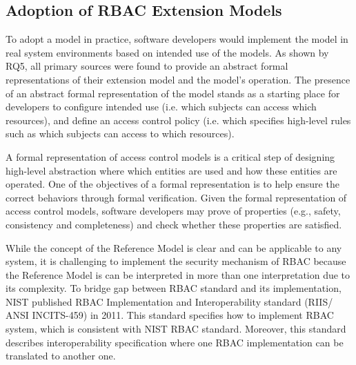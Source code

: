 \subsection{Adoption of RBAC Extension Models}

To adopt a model in practice, software developers would implement the model in real system environments based on intended use of the models. 
As shown by RQ5, all primary sources were found to provide an abstract formal representations of their extension model and the model's operation.
The presence of an abstract formal representation of the model stands as a starting place for developers to configure intended use (i.e. which subjects can access which resources), and define an access control policy (i.e. which specifies high-level rules such as which subjects can access to which resources). 

A formal representation of access control models is a critical step of designing high-level abstraction where which entities are used and how these entities are operated.
One of the objectives of a formal representation is to help ensure the correct behaviors through formal verification. 
Given the formal representation of access control models, software developers may prove of properties (e.g., safety, consistency and completeness) and check whether these properties are satisfied. 

While the concept of the Reference Model is clear and can be applicable to any system, it is challenging to implement the security mechanism of RBAC because the Reference Model is can be interpreted in more than one interpretation due to its complexity. 
To bridge gap between RBAC standard and its implementation, NIST published RBAC Implementation and Interoperability standard (RIIS/ ANSI INCITS-459) in 2011. 
This standard specifies how to implement RBAC system, which is consistent with NIST RBAC standard. 
Moreover, this standard describes interoperability specification where one RBAC implementation can be translated to another one.


